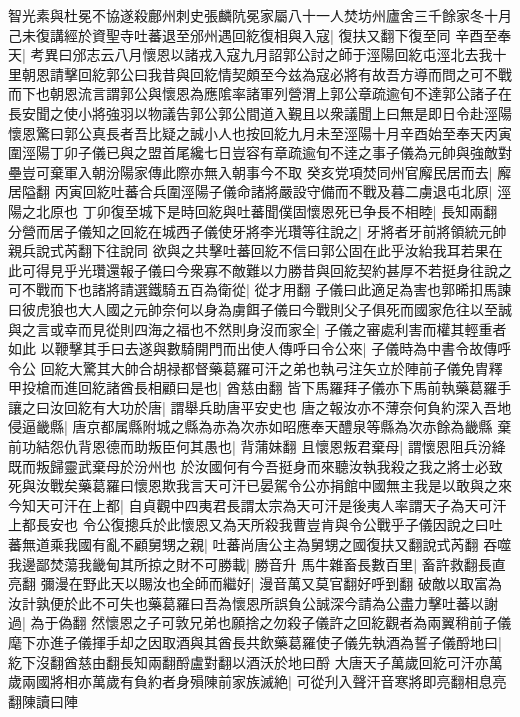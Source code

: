 智光素與杜冕不協遂殺鄜州刺史張麟阬冕家屬八十一人焚坊州廬舍三千餘家冬十月己未復講經於資聖寺吐蕃退至邠州遇回紇復相與入寇|{
	復扶又翻下復至同}
辛酉至奉天|{
	考異曰邠志云八月懷恩以諸戎入寇九月詔郭公討之師于涇陽回紇屯涇北去我十里朝恩請擊回紇郭公曰我昔與回紇情契頗至今兹為寇必將有故吾方導而問之可不戰而下也朝恩流言謂郭公與懷恩為應隂率諸軍列營渭上郭公章疏逾旬不達郭公諸子在長安聞之使小將強羽以物議告郭公郭公間道入覲且以衆議聞上曰無是即日令赴涇陽懷恩驚曰郭公真長者吾比疑之誠小人也按回紇九月未至涇陽十月辛酉始至奉天丙寅圍涇陽丁卯子儀已與之盟首尾纔七日豈容有章疏逾旬不逹之事子儀為元帥與強敵對壘豈可棄軍入朝汾陽家傳此際亦無入朝事今不取}
癸亥党項焚同州官廨民居而去|{
	廨居隘翻}
丙寅回紇吐蕃合兵圍涇陽子儀命諸將嚴設守備而不戰及暮二虜退屯北原|{
	涇陽之北原也}
丁卯復至城下是時回紇與吐蕃聞僕固懷恩死已争長不相睦|{
	長知兩翻}
分營而居子儀知之回紇在城西子儀使牙將李光瓚等往說之|{
	牙將者牙前將領統元帥親兵說式芮翻下往說同}
欲與之共擊吐蕃回紇不信曰郭公固在此乎汝紿我耳若果在此可得見乎光瓚還報子儀曰今衆寡不敵難以力勝昔與回紇契約甚厚不若挺身往說之可不戰而下也諸將請選鐵騎五百為衛從|{
	從才用翻}
子儀曰此適足為害也郭晞扣馬諫曰彼虎狼也大人國之元帥奈何以身為虜餌子儀曰今戰則父子俱死而國家危往以至誠與之言或幸而見從則四海之福也不然則身沒而家全|{
	子儀之審處利害而權其輕重者如此}
以鞭擊其手曰去遂與數騎開門而出使人傳呼曰令公來|{
	子儀時為中書令故傳呼令公}
回紇大驚其大帥合胡禄都督藥葛羅可汗之弟也執弓注矢立於陣前子儀免胄釋甲投槍而進回紇諸酋長相顧曰是也|{
	酋慈由翻}
皆下馬羅拜子儀亦下馬前執藥葛羅手讓之曰汝回紇有大功於唐|{
	謂舉兵助唐平安史也}
唐之報汝亦不薄奈何負約深入吾地侵逼畿縣|{
	唐京都属縣附城之縣為赤為次赤如昭應奉天醴泉等縣為次赤餘為畿縣}
棄前功結怨仇背恩德而助叛臣何其愚也|{
	背蒲妹翻}
且懷恩叛君棄母|{
	謂懷恩阻兵汾絳既而叛歸靈武棄母於汾州也}
於汝國何有今吾挺身而來聽汝執我殺之我之將士必致死與汝戰矣藥葛羅曰懷恩欺我言天可汗已晏駕令公亦捐館中國無主我是以敢與之來今知天可汗在上都|{
	自貞觀中四夷君長謂太宗為天可汗是後夷人率謂天子為天可汗上都長安也}
令公復摠兵於此懷恩又為天所殺我曹豈肯與令公戰乎子儀因說之曰吐蕃無道乘我國有亂不顧舅甥之親|{
	吐蕃尚唐公主為舅甥之國復扶又翻說式芮翻}
吞噬我邊鄙焚蕩我畿甸其所掠之財不可勝載|{
	勝音升}
馬牛雜畜長數百里|{
	畜許救翻長直亮翻}
彌漫在野此天以賜汝也全師而繼好|{
	漫音萬又莫官翻好呼到翻}
破敵以取富為汝計孰便於此不可失也藥葛羅曰吾為懷恩所誤負公誠深今請為公盡力擊吐蕃以謝過|{
	為于偽翻}
然懷恩之子可敦兄弟也願捨之勿殺子儀許之回紇觀者為兩翼稍前子儀麾下亦進子儀揮手却之因取酒與其酋長共飲藥葛羅使子儀先執酒為誓子儀酹地曰|{
	紇下沒翻酋慈由翻長知兩翻酹盧對翻以酒沃於地曰酹}
大唐天子萬歲回紇可汗亦萬歲兩國將相亦萬歲有負約者身殞陳前家族滅絶|{
	可從刋入聲汗音寒將即亮翻相息亮翻陳讀曰陣}
